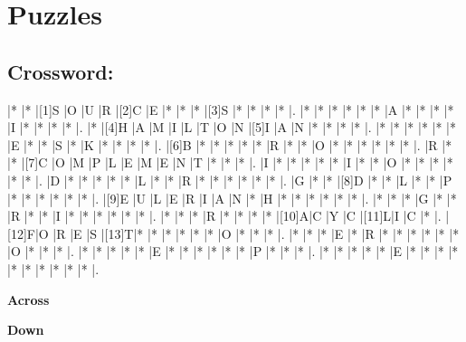 \documentclass{article}
\begin{document}
\section*{Puzzles}

\subsection*{Crossword:}

\begin{Puzzle}{16}{16} %
|*    |*    |[1]S |O    |U    |R    |[2]C |E    |*    |*    |*    |[3]S |*    |*    |*    |*    |.
|*    |*    |*    |*    |*    |*    |A    |*    |*    |*    |*    |I    |*    |*    |*    |*    |.
|*    |[4]H |A    |M    |I    |L    |T    |O    |N    |[5]I |A    |N    |*    |*    |*    |*    |.
|*    |*    |*    |*    |*    |*    |E    |*    |*    |S    |*    |K    |*    |*    |*    |*    |.
|[6]B |*    |*    |*    |*    |*    |R    |*    |*    |O    |*    |*    |*    |*    |*    |*    |.
|R    |*    |*    |[7]C |O    |M    |P    |L    |E    |M    |E    |N    |T    |*    |*    |*    |.
|I    |*    |*    |*    |*    |*    |I    |*    |*    |O    |*    |*    |*    |*    |*    |*    |.
|D    |*    |*    |*    |*    |*    |L    |*    |*    |R    |*    |*    |*    |*    |*    |*    |.
|G    |*    |*    |[8]D |*    |*    |L    |*    |*    |P    |*    |*    |*    |*    |*    |*    |.
|[9]E |U    |L    |E    |R    |I    |A    |N    |*    |H    |*    |*    |*    |*    |*    |*    |.
|*    |*    |*    |G    |*    |*    |R    |*    |*    |I    |*    |*    |*    |*    |*    |*    |.
|*    |*    |*    |R    |*    |*    |*    |*    |[10]A|C    |Y    |C    |[11]L|I    |C    |*    |.
|[12]F|O    |R    |E    |S    |[13]T|*    |*    |*    |*    |*    |*    |O    |*    |*    |*    |.
|*    |*    |*    |E    |*    |R    |*    |*    |*    |*    |*    |*    |O    |*    |*    |*    |.
|*    |*    |*    |*    |*    |E    |*    |*    |*    |*    |*    |*    |P    |*    |*    |*    |.
|*    |*    |*    |*    |*    |E    |*    |*    |*    |*    |*    |*    |*    |*    |*    |*    |.
\end{Puzzle}


\begin{PuzzleClues}{\textbf{Across}} %
\end{PuzzleClues} %
%
\begin{PuzzleClues}{\textbf{Down}}
\end{PuzzleClues}
\end{document}
